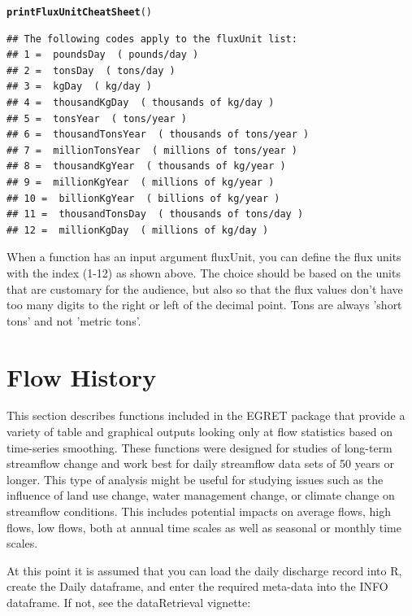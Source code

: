 \documentclass[a4paper,11pt]{article}\usepackage{graphicx, color}
\makeatletter
\newcommand{\hlfunctioncall}[1]{\textcolor[rgb]{0.501960784313725,0,0.329411764705882}{\textbf{#1}}}%
\newenvironment{kframe}{%
 \def\at@end@of@kframe{}%
 \ifinner\ifhmode%
  \def\at@end@of@kframe{\end{minipage}}%
  \begin{minipage}{\columnwidth}%
 \fi\fi%
 \def\FrameCommand##1{\hskip\@totalleftmargin \hskip-\fboxsep
 \colorbox{shadecolor}{##1}\hskip-\fboxsep
     \hskip-\linewidth \hskip-\@totalleftmargin \hskip\columnwidth}%
 \MakeFramed {\advance\hsize-\width
   \@totalleftmargin\z@ \linewidth\hsize
   \@setminipage}}%
 {\par\unskip\endMakeFramed%
 \at@end@of@kframe}
\newenvironment{knitrout}{}{} %
\makeatother
\begin{document}
\begin{knitrout}
\color{fgcolor}\begin{kframe}
\begin{alltt}
\hlfunctioncall{printFluxUnitCheatSheet}()
\end{alltt}
\begin{verbatim}
## The following codes apply to the fluxUnit list:
## 1 =  poundsDay  ( pounds/day )
## 2 =  tonsDay  ( tons/day )
## 3 =  kgDay  ( kg/day )
## 4 =  thousandKgDay  ( thousands of kg/day )
## 5 =  tonsYear  ( tons/year )
## 6 =  thousandTonsYear  ( thousands of tons/year )
## 7 =  millionTonsYear  ( millions of tons/year )
## 8 =  thousandKgYear  ( thousands of kg/year )
## 9 =  millionKgYear  ( millions of kg/year )
## 10 =  billionKgYear  ( billions of kg/year )
## 11 =  thousandTonsDay  ( thousands of tons/day )
## 12 =  millionKgDay  ( millions of kg/day )
\end{verbatim}
\end{kframe}
\end{knitrout}


When a function has an input argument fluxUnit, you can define the flux units with the index (1-12) as shown above. The choice should be based on the units that are customary for the audience, but also so that the flux values don't have too many digits to the right or left of the decimal point. Tons are always 'short tons' and not 'metric tons'.

\section{Flow History}
\label{sec:flowHistory}
This section describes functions included in the EGRET package that provide a variety of table and graphical outputs looking only at flow statistics based on time-series smoothing. These functions were designed for studies of long-term streamflow change and work best for daily streamflow data sets of 50 years or longer. This type of analysis might be useful for studying issues such as the influence of land use change, water management change, or climate change on streamflow conditions.  This includes potential impacts on average flows, high flows, low flows, both at annual time scales as well as seasonal or monthly time scales. 

At this point it is assumed that you can load the daily discharge record into R, create the Daily dataframe, and enter the required meta-data into the INFO dataframe. If not, see the dataRetrieval vignette:
\end{document}
